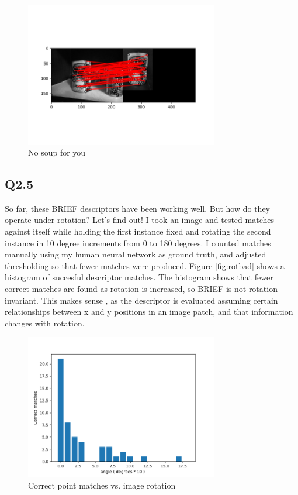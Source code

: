\documentclass[12pt]{article}
\begin{document}
\begin{figure}[H]
\centering
\includegraphics[page=1,width=0.75\textwidth]{q2_4}
\caption{ No soup for you }
\label{fig:plotmatch}
\end{figure}   


\newpage
\subsection{Q2.5}
So far, these BRIEF descriptors have been working well. But how do they operate under rotation? Let's find out! I took an image and tested matches against itself while holding the first instance fixed and rotating the second instance in 10 degree increments from 0 to 180 degrees. I counted matches manually using my human neural network as ground truth, and adjusted thresholding so that fewer matches were produced. Figure \ref{fig:rotbad} shows a histogram of succesful descriptor matches. The histogram shows that fewer correct matches are found as rotation is increased, so BRIEF is not rotation invariant. This makes sense , as the descriptor is evaluated assuming certain relationships between x and y positions in an image patch, and that information changes with rotation.

\begin{figure}[H]
\centering
\includegraphics[page=1,width=0.75\textwidth]{q2_5}
\caption{ Correct point matches vs. image rotation } 
\label{fig:imgrot}
\end{figure}   
\end{document}

